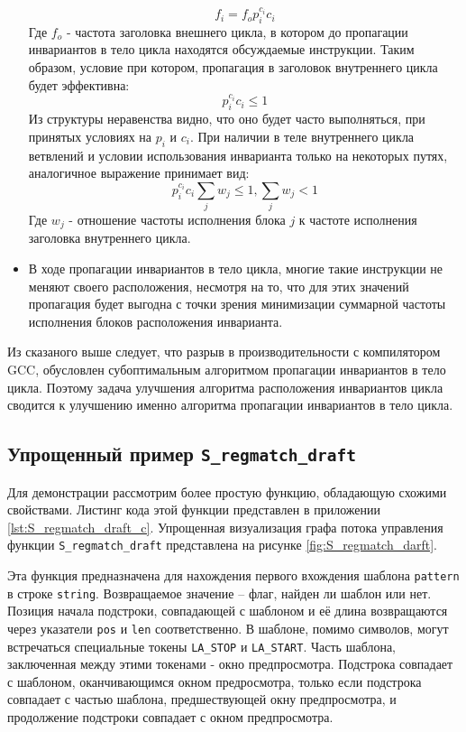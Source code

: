 \begin{itemize}
        $$ f_i = f_o  p_i^{c_i}  c_i $$
        Где $f_o$ - частота заголовка внешнего цикла, в котором до пропагации инвариантов в тело цикла находятся обсуждаемые инструкции.
        Таким образом, условие при котором, пропагация в заголовок внутреннего цикла будет эффективна:
        $$ p_i^{c_i}  c_i \leq 1 $$
        Из структуры неравенства видно, что оно будет часто выполняться, при принятых условиях на $p_i$ и $c_i$.
        При наличии в теле внутреннего цикла ветвлений и условии использования инварианта только на некоторых путях, аналогичное выражение принимает вид:
        $$ p_i^{c_i} c_i \sum_j{w_j} \leq 1 , \sum_j{w_j} < 1 $$
        Где $w_j$ - отношение частоты исполнения блока $j$ к частоте исполнения заголовка внутреннего цикла.
    \item В ходе пропагации инвариантов в тело цикла, многие такие инструкции не меняют своего расположения, несмотря на то, что для этих значений пропагация будет выгодна с точки зрения минимизации суммарной частоты исполнения блоков расположения инварианта.
\end{itemize}

Из сказаного выше следует, что разрыв в производительности с компилятором GCC, обусловлен субоптимальным алгоритмом пропагации инвариантов в тело цикла.
Поэтому задача улучшения алгоритма расположения инвариантов цикла сводится к улучшению именно алгоритма пропагации инвариантов в тело цикла.

\subsection{Упрощенный пример \texttt{S\_regmatch\_draft}}

Для демонстрации рассмотрим более простую функцию, обладающую схожими свойствами.
Листинг кода этой функции представлен в приложении \ref{lst:S_regmatch_draft_c}.
Упрощенная визуализация графа потока управления функции \texttt{S\_regmatch\_draft} представлена на рисунке \ref{fig:S_regmatch_darft}.

Эта функция предназначена для нахождения первого вхождения шаблона \texttt{pattern} в строке \texttt{string}.
Возвращаемое значение -- флаг, найден ли шаблон или нет.
Позиция начала подстроки, совпадающей с шаблоном и её длина возвращаются через указатели \texttt{pos} и \texttt{len} соответственно.
В шаблоне, помимо символов, могут встречаться специальные токены \texttt{LA\_STOP} и \texttt{LA\_START}.
Часть шаблона, заключенная между этими токенами - окно предпросмотра.
Подстрока совпадает с шаблоном, оканчивающимся окном предросмотра, только если подстрока совпадает с частью шаблона, предшествующей окну предпросмотра, и продолжение подстроки совпадает с окном предпросмотра.

